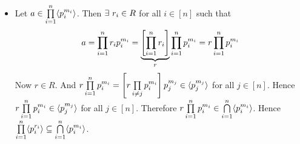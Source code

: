 \documentclass[a4paper, 11pt]{article}
\begin{document}
{\begin{itemize}[label=$\bullet$]
	Now suppose $x_i\in P$ for any $i\in\{2,\dots, k\}$. Then $x_i=p_i^{e_i}x_{i+1}$. Therefore is $p_i^{e_i}\notin P$ then $x_{i+1}^{m_{i+1}}\in P$ for some $m_{i+1}\in \bbN$ and $m_{i+1}>0$. If $p_i^{e_i}\in P$ then $P=\la p_i^{e_i}\ra$ and we are done. Else $x_{i+1}^{m_{i+1}}\in P$. Now $$x_{i+1}^{m_{i+1}}=\prod_{j=i+1}^k p_j^{e_jm_{i+1}}$$Since $x_{i+1}^{m_{i+1}}\in P$, $\exs\ r_{i+1}\in R$ such that $x_{i+1}^{m_{i+1}}=r_{i+1}\prod\limits_{j=1}^{n} p_j^{e_j}$. Then we have $$\prod_{j=i+1}^k p_j^{e_jm_{i+1}}=r_{i+1}\prod\limits_{j=1}^{n} p_j^{e_j}\implies\prod_{j=i+1}^k p_j^{(m_{i+1}-1)e_j}=r\prod_{j=1}^ip_j^{e_j} \implies p_j\mid \prod_{j=i+1}^k p_j^{(m_{i+1}-1)e_j}\ \forall\ j\in[i]$$Therefore for all $j\in [i]$, $\exs\ j_l\in \{i+1,\dots, k\}$ such that $$p_j\mid p_{j_l}^{(m_{i+1}-1)e_{j_l}}$$Therefore $p_j$ and $p_{j_l}$ are associates which is not possible unless $m_{i+1}=1$ or $P=0$. Therefore $m_{i+1}=1$. Hence $x_{i+1}\in P$. 
	
	Therefore we can continue like this and obtain either $p_1^{e_1}\in P\implies P=\la p_1^{e_1}\ra$ or else  $p_1^{e_1}\notin P \implies x_2\in P$. For second case either  then  $p_2^{e_2}\in P\implies P=\la p_2^{e_2}\ra$ or else  $p_2^{e_2}\notin P\implies x_3\in P$.  For second case  then  $p_3^{e_3}\in P\implies P=\la p_3^{e_3}\ra$ or else  $p_3^{e_3}\notin P\implies x_4\in P$. Continuing like this we have if $x_i\in P$ then either $p_i^{e_i}\in P\implies P=\la p_i^{e_i}\ra$ or $p_i^{e_i}\notin P\implies x_{i+1}\in P$. And at the end we get either $p_{k-1}^{e_{k-1}}\in P\implies P=\la p_{k-1}^{e_{k-1}}$ else  $p_{k-1}^{e_{k-1}}\notin P\implies x_k=p_k^{e_k}\in P\implies P=\la p_k^{e_k}\ra$. Therefore we obtain $\exs \ i\in[k]$ such that $P=\la p_i^{e_i}\ra $. 
	
	
	Now suppose $P=\la p^m\ra$. Now let $ab\in P$ where $a,b\in R$. Suppose $a\notin P$. Since $ab\in P$, $p^m\mid ab\implies p\mid ab$. Since $p$ is prime $p\mid a$ or $p\mid b$. Now we will show that if $b^k\notin P$ for all $K\in \bbN$ then $a\in P$. Now $b^k\notin P$ for all $k\in \bbN$. Hence $p^m\nmid b^k$ for all $k\in\bbN$. Therefore $p\nmid b$ since otherwise $p^n\mid b^n$. Therefore $p\mid a$. Since $p^n\mid ab$ and $p^n\nmid b$ we have $p^n\mid a$. Therefore $a\in P$. Hence $P$ is primary ideal. 
	\item Let $a\in \prod\limits_{i=1}^n \langle p_i^{m_i}\rangle$. Then $\exists\ r_i\in R$ for all $i\in [n]$ such that $$a=\prod\limits_{i=1}^n r_ip_i^{m_i}= \underbrace{\left[\prod\limits_{i=1}^n r_i\right]}_{r}\prod\limits_{i=1}^n p_i^{m_i}= r\prod\limits_{i=1}^n p_i^{m_i}$$Now $r\in R$. And $r\prod\limits_{i=1}^n p_i^{m_i}=\left[r\prod\limits_{i\neq j} p_i^{m_i}\right]p_j^{m_j}\in \langle p_j^{m_j}\rangle$ for all $j\in[n]$. Hence $r\prod\limits_{i=1}^n p_i^{m_i}\in \langle p_j^{m_j}\rangle$ for all $j\in[n]$. Therefore $r\prod\limits_{i=1}^n p_i^{m_i}\in \bigcap\limits_{i=1}^n \langle p_i^{m_i}\rangle$. Hence $\prod\limits_{i=1}^n \langle p_i^{r_i}\rangle \subseteq \bigcap\limits_{i=1}^n \langle p_i^{m_i}\rangle$.\parinn
	

\end{itemize}}
\end{document}
